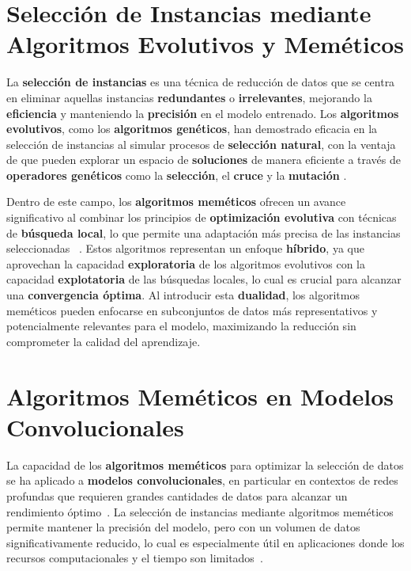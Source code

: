 \section{Selección de Instancias mediante Algoritmos Evolutivos y Meméticos}
\label{sec:seleccion-de-instancias-mediante-algoritmos-evolutivos-y-memeticos}
La \textbf{selección de instancias} es una técnica de reducción de datos que se centra en eliminar aquellas instancias
\textbf{redundantes} o \textbf{irrelevantes}, mejorando la \textbf{eficiencia} y manteniendo la \textbf{precisión} en
el modelo entrenado.
Los \textbf{algoritmos evolutivos}, como los \textbf{algoritmos genéticos}, han demostrado eficacia en la selección de
instancias al simular procesos de \textbf{selección natural}, con la ventaja de que pueden explorar un espacio de
\textbf{soluciones} de manera eficiente a través de \textbf{operadores genéticos} como la \textbf{selección}, el
\textbf{cruce} y la \textbf{mutación} \cite{holland_adaptation_1975}.


Dentro de este campo, los \textbf{algoritmos meméticos} ofrecen un avance significativo al combinar los principios de
\textbf{optimización evolutiva} con técnicas de \textbf{búsqueda local}, lo que permite una adaptación más precisa de
las instancias seleccionadas
~\cite{moscato_evolution_2000}.
Estos algoritmos representan un enfoque \textbf{híbrido}, ya que aprovechan la capacidad \textbf{exploratoria} de los
algoritmos evolutivos con la capacidad \textbf{explotatoria} de las búsquedas locales, lo cual es crucial para alcanzar
una \textbf{convergencia óptima}.
Al introducir esta \textbf{dualidad}, los algoritmos meméticos pueden enfocarse en subconjuntos de datos más
representativos y potencialmente relevantes para el modelo, maximizando la reducción sin comprometer la calidad del
aprendizaje.


\section{Algoritmos Meméticos en Modelos Convolucionales}\label{sec:algoritmos-memeticos-en-modelos-convolucionales}
La capacidad de los \textbf{algoritmos meméticos} para optimizar la selección de datos se ha aplicado a
\textbf{modelos convolucionales}, en particular en contextos de redes profundas que requieren grandes cantidades de
datos para alcanzar un rendimiento óptimo~\cite{he_deep_2016}.
La selección de instancias mediante algoritmos meméticos permite mantener la precisión del modelo, pero con un volumen
de datos significativamente reducido, lo cual es especialmente útil en aplicaciones donde los recursos computacionales
y el tiempo son
limitados~\cite{dong_memetic_2020}.


